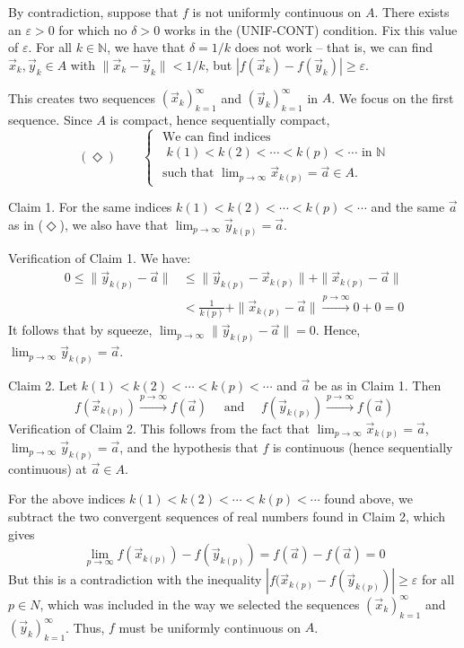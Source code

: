\documentclass[11pt]{article}
\makeatletter
\theoremstyle{definition}
\newcommand{\N}{\ensuremath{\mathbb{N}}}
\newenvironment{pf}[1][\proofname]{\par
  \pushQED{\qed}%
  \normalfont \topsep0\p@\relax
  \trivlist
  \item[\hskip\labelsep\itshape
  #1\@addpunct{.}]\ignorespaces
}{%
  \popQED\endtrivlist\@endpefalse
}
\makeatother
\begin{document}
\begin{pf}
By contradiction, suppose that $f$ is not uniformly continuous on $A$. There exists an $\varepsilon > 0$ for which no $\delta > 0$ works in the (UNIF-CONT) condition. Fix this value of $\varepsilon$. For all $k \in \N$, we have that $\delta = 1/k$ does not work -- that is, we can find $\vec{x}_k, \vec{y}_k \in A$ with $\| \vec{x}_k - \vec{y}_k \| < 1/k$, but $|f(\vec{x}_k) - f(\vec{y}_k)| \geq \varepsilon$. 

This creates two sequences $(\vec{x}_k)_{k=1}^\infty$ and $(\vec{y}_k)_{k=1}^\infty$ in $A$. We focus on the first sequence. Since $A$ is compact, hence sequentially compact,
\[ (\Diamond) \quad\quad \begin{cases} \text{ We can find indices} \\ \text{ $k(1) < k(2) < \cdots < k(p) < \cdots$ in $\N$} \\ \text{ such that $\lim\nolimits_{p\to\infty} \vec{x}_{k(p)} = \vec{a} \in A$.} \end{cases} \] 

{\sc Claim 1.} For the same indices $k(1) < k(2) < \cdots < k(p) < \cdots$ and the same $\vec{a}$ as in ($\Diamond$), we also have that $\lim_{p\to\infty} \vec{y}_{k(p)} = \vec{a}$.

{\sc Verification of Claim 1.} We have:
\begin{align*}
    0 \leq \| \vec{y}_{k(p)} - \vec{a} \| &\leq \| \vec{y}_{k(p)} - \vec{x}_{k(p)} \| + \| \vec{x}_{k(p)} - \vec{a} \| \\
    &< \frac{1}{k(p)} + \| \vec{x}_{k(p)} - \vec{a} \| \xrightarrow[]{p\to\infty} 0 + 0 = 0
\end{align*}
It follows that by squeeze, $\lim_{p\to\infty} \| \vec{y}_{k(p)} - \vec{a} \| = 0$. Hence, $\lim_{p\to\infty} \vec{y}_{k(p)} = \vec{a}$.

{\sc Claim 2.} Let $k(1) < k(2) < \cdots < k(p) < \cdots$ and $\vec{a}$ be as in Claim 1. Then
\[ f(\vec{x}_{k(p)}) \xrightarrow[]{p\to\infty} f(\vec{a}) \quad \text{ and } \quad f(\vec{y}_{k(p)}) \xrightarrow[]{p\to\infty}  f(\vec{a}) \]
{\sc Verification of Claim 2.} This follows from the fact that $\lim_{p\to\infty} \vec{x}_{k(p)} = \vec{a}$, $\lim_{p\to\infty} \vec{y}_{k(p)} = \vec{a}$, and the hypothesis that $f$ is continuous (hence sequentially continuous) at $\vec{a} \in A$. 

For the above indices $k(1) < k(2) < \cdots < k(p) < \cdots$ found above, we subtract the two convergent sequences of real numbers found in Claim 2, which gives
\[ \lim_{p\to\infty} f(\vec{x}_{k(p)}) - f(\vec{y}_{k(p)}) = f(\vec{a}) - f(\vec{a}) = 0 \]
But this is a contradiction with the inequality $| f(\vec{x}_{k(p)} - f(\vec{y}_{k(p)}) | \geq \varepsilon$ for all $p \in N$, which was included in the way we selected the sequences $(\vec{x}_k)_{k=1}^\infty$ and $(\vec{y}_k)_{k=1}^\infty$. Thus, $f$ must be uniformly continuous on $A$.
\end{pf}
\end{document}
